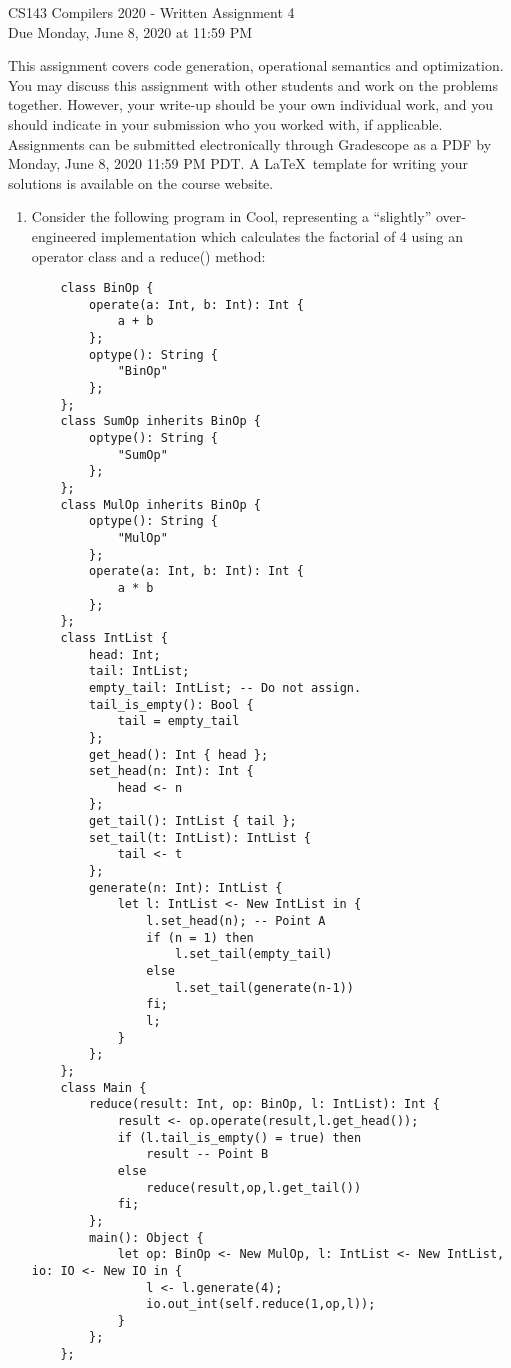 \documentclass[11pt]{article}
\begin{document}
\begin{center}
\LARGE CS143 Compilers 2020 - Written Assignment 4 \\
\large Due Monday, June 8, 2020 at 11:59 PM
\end{center}

This assignment covers code generation, operational semantics and optimization. You may discuss this assignment with other students and work on the problems together. However, your write-up should be your own individual work, and you should indicate in your submission who you worked with, if applicable. Assignments can be submitted electronically through Gradescope as a PDF by Monday, June 8, 2020 11:59 PM PDT. A \LaTeX \ template for writing your solutions is available on the course website.

\begin{enumerate}
  \item Consider the following program in Cool, representing a ``slightly'' over-engineered implementation which calculates the factorial of 4 using an operator class and a reduce() method:
  \begin{lstlisting}
    class BinOp {
        operate(a: Int, b: Int): Int {
            a + b
        };
        optype(): String {
            "BinOp"
        };
    };
    class SumOp inherits BinOp { 
        optype(): String {
            "SumOp"
        };
    };
    class MulOp inherits BinOp {
        optype(): String {
            "MulOp"
        };
        operate(a: Int, b: Int): Int {
            a * b
        };
    };
    class IntList {
        head: Int;
        tail: IntList;
        empty_tail: IntList; -- Do not assign.
        tail_is_empty(): Bool {
            tail = empty_tail
        };
        get_head(): Int { head };
        set_head(n: Int): Int {
            head <- n
        };
        get_tail(): IntList { tail };
        set_tail(t: IntList): IntList {
            tail <- t
        };
        generate(n: Int): IntList {
            let l: IntList <- New IntList in {
                l.set_head(n); -- Point A
                if (n = 1) then
                    l.set_tail(empty_tail)
                else
                    l.set_tail(generate(n-1))
                fi;
                l;
            }
        };
    };
    class Main {
        reduce(result: Int, op: BinOp, l: IntList): Int {
            result <- op.operate(result,l.get_head());
            if (l.tail_is_empty() = true) then
                result -- Point B
            else
                reduce(result,op,l.get_tail())
            fi;
        };
        main(): Object {
            let op: BinOp <- New MulOp, l: IntList <- New IntList, io: IO <- New IO in {
                l <- l.generate(4); 
                io.out_int(self.reduce(1,op,l));
            }
        };
    };
  \end{lstlisting}
  

\end{enumerate}
\end{document}
